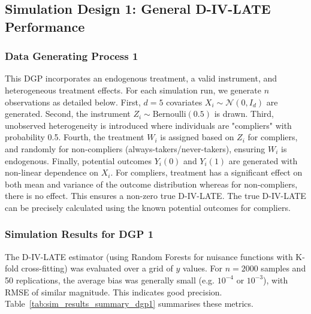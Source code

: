 \documentclass[final,3p,fleqn, 10pt]{elsarticle}
\begin{document}
\subsection{Simulation Design 1: General D-IV-LATE Performance}
\label{subsec:sim_dgp1}

\subsubsection{Data Generating Process 1}
This DGP incorporates an endogenous treatment, a valid instrument, and heterogeneous treatment effects. For each simulation run, we generate $n$ observations as detailed below.
First, $d=5$ covariates $X_i \sim \mathcal{N}(0, I_d)$ are generated. Second, the instrument $Z_i \sim \text{Bernoulli}(0.5)$ is drawn. Third, unobserved heterogeneity is introduced where individuals are "compliers" with probability 0.5. Fourth, the treatment $W_i$ is assigned based on $Z_i$ for compliers, and randomly for non-compliers (always-takers/never-takers), ensuring $W_i$ is endogenous. Finally, potential outcomes $Y_i(0)$ and $Y_i(1)$ are generated with non-linear dependence on $X_i$. For compliers, treatment has a significant effect on both mean and variance of the outcome distribution whereas for non-compliers, there is no effect. This ensures a non-zero true D-IV-LATE.
The true D-IV-LATE can be precisely calculated using the known potential outcomes for compliers.

\subsubsection{Simulation Results for DGP 1}
The D-IV-LATE estimator (using Random Forests for nuisance functions with K-fold cross-fitting) was evaluated over a grid of $y$ values. For $n=2000$ samples and 50 replications, the average bias was generally small (e.g. $10^{-4}$ or $10^{-3}$), with RMSE of similar magnitude. This indicates good precision. Table~\ref{tab:sim_results_summary_dgp1} summarises these metrics.
\end{document}
